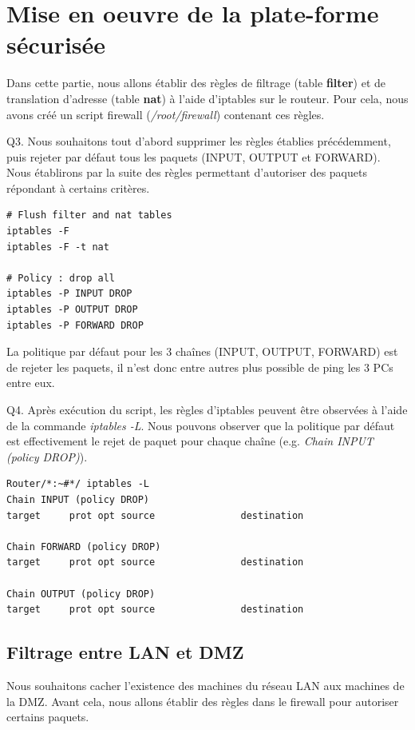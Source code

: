 \documentclass[frenchb, 11pt]{article}
\newlength{\leftbarwidth}
\newlength{\leftbarsep}
\newcommand*{\leftbarcolorcmd}{\color{leftbarcolor}} %
\renewenvironment{leftbar}{%
    \def\FrameCommand{{\leftbarcolorcmd{\vrule width \leftbarwidth\relax\hspace {\leftbarsep}}}}%
    \MakeFramed {\advance \hsize -\width \FrameRestore }%
}{%
    \endMakeFramed
}
\begin{document}
\section{Mise en oeuvre de la plate-forme sécurisée}
Dans cette partie, nous allons établir des règles de filtrage (table \textbf{filter}) et de translation d'adresse (table \textbf{nat}) à l'aide d'iptables sur le routeur. Pour cela, nous avons créé un script firewall (\emph{/root/firewall}) contenant ces règles.

\begin{leftbar}
	\noindent Q3. Nous souhaitons tout d'abord supprimer les règles établies précédemment, puis rejeter par défaut tous les paquets (INPUT, OUTPUT et FORWARD). Nous établirons par la suite des règles permettant d'autoriser des paquets répondant à certains critères.
	\begin{lstlisting}[numbers=none]
# Flush filter and nat tables
iptables -F
iptables -F -t nat

# Policy : drop all
iptables -P INPUT DROP
iptables -P OUTPUT DROP
iptables -P FORWARD DROP
	\end{lstlisting}
\end{leftbar}

La politique par défaut pour les 3 chaînes (INPUT, OUTPUT, FORWARD) est de rejeter les paquets, il n'est donc entre autres plus possible de ping les 3 PCs entre eux.

\begin{leftbar}
	\noindent Q4. Après exécution du script, les règles d'iptables peuvent être observées à l'aide de la commande \emph{iptables -L}. Nous pouvons observer que la politique par défaut est effectivement le rejet de paquet pour chaque chaîne (e.g. \emph{Chain INPUT (policy DROP)}).
	\begin{lstlisting}[numbers=none]
Router/*:~#*/ iptables -L
Chain INPUT (policy DROP)
target     prot opt source               destination

Chain FORWARD (policy DROP)
target     prot opt source               destination

Chain OUTPUT (policy DROP)
target     prot opt source               destination
	\end{lstlisting}
\end{leftbar}

\subsection{Filtrage entre LAN et DMZ}
Nous souhaitons cacher l'existence des machines du réseau LAN aux machines de la DMZ. Avant cela, nous allons établir des règles dans le firewall pour autoriser certains paquets.
\end{document}
